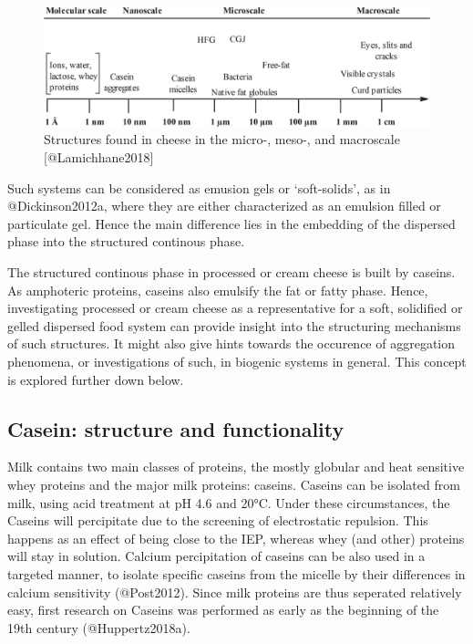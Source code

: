 \documentclass[
]{article}
\begin{document}
\begin{figure}
\includegraphics[width=0.75\linewidth]{images/scales_cheese_Lamichhane2018} \caption{Structures found in cheese in the micro-, meso-, and macroscale [@Lamichhane2018] }\label{fig:unnamed-chunk-1}
\end{figure}

Such systems can be considered as emusion gels or `soft-solids', as in
@Dickinson2012a, where they are either characterized as an emulsion
filled or particulate gel. Hence the main difference lies in the
embedding of the dispersed phase into the structured continous phase.

The structured continous phase in processed or cream cheese is built by
caseins. As amphoteric proteins, caseins also emulsify the fat or fatty
phase. Hence, investigating processed or cream cheese as a
representative for a soft, solidified or gelled dispersed food system
can provide insight into the structuring mechanisms of such structures.
It might also give hints towards the occurence of aggregation phenomena,
or investigations of such, in biogenic systems in general. This concept
is explored further down below.

\subsection{Casein: structure and functionality}

Milk contains two main classes of proteins, the mostly globular and heat
sensitive whey proteins and the major milk proteins: caseins. Caseins
can be isolated from milk, using acid treatment at pH 4.6 and 20°C.
Under these circumstances, the Caseins will percipitate due to the
screening of electrostatic repulsion. This happens as an effect of being
close to the IEP, whereas whey (and other) proteins will stay in
solution. Calcium percipitation of caseins can be also used in a
targeted manner, to isolate specific caseins from the micelle by their
differences in calcium sensitivity (@Post2012). Since milk proteins are
thus seperated relatively easy, first research on Caseins was performed
as early as the beginning of the 19th century (@Huppertz2018a).
\end{document}
